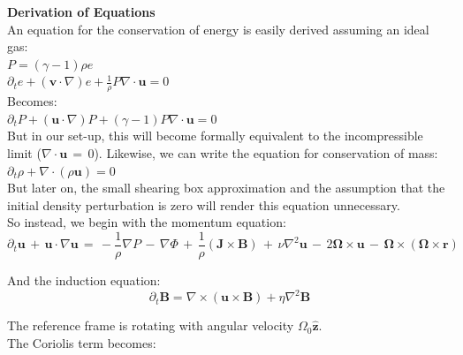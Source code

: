 \documentclass[letterpaper,12pt]{article}
\begin{document}
\vspace{10cm}

\textbf{Derivation of Equations} \\

An equation for the conservation of energy is easily derived assuming an ideal gas: \\

$P = \left(\gamma - 1\right)\rho e$\\

$\partial_t e + \left(\mathbf{v}\cdot \nabla\right) e + \frac{1}{\rho}P\nabla \cdot \mathbf{u} = 0$ \\

Becomes: \\

$\partial_t P + \left(\mathbf{u} \cdot \nabla\right)P + \left(\gamma -1\right)P\nabla \cdot \mathbf{u} = 0$ \\

But in our set-up, this will become formally equivalent to the incompressible limit ($\nabla \cdot \mathbf{u} \,=\, 0$). Likewise, we can write the equation for conservation of mass: \\

$\partial_t \rho + \nabla \cdot \left(\rho \mathbf{u}\right) = 0$ \\

But later on, the small shearing box approximation and the assumption that the initial density perturbation is zero will render this equation unnecessary. \\

So instead, we begin with the momentum equation: 
\[\partial_t \mathbf{u} \, + \, \mathbf{u} \cdot \nabla \mathbf{u} \, = \, -\frac{1}{\rho}\nabla P \, - \, \nabla\Phi \, + \, \frac{1}{\rho} \left(\mathbf{J}\times\mathbf{B}\right) \, + \, \nu\nabla^2 \mathbf{u} \, - \, 2\mathbf{\Omega} \times \mathbf{u} \, - \, \mathbf{\Omega} \times \left(\mathbf{\Omega} \times \mathbf{r} \right)\]

And the induction equation:
\[\partial_t \mathbf{B} = \nabla \times \left(\mathbf{u} \times \mathbf{B}\right) + \eta\nabla^2\mathbf{B} \]

The reference frame is rotating with angular velocity $\Omega_0 \mathbf{\hat{z}}$. \\

The Coriolis term becomes: \\
\end{document}
